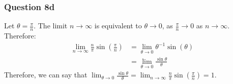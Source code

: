 \documentclass{article}
\begin{document}
\subsubsection*{Question 8d}
Let $\theta=\frac{\pi}{n}$. The limit $n\to\infty$ is equivalent to $\theta\to 0$, as $\frac{\pi}{n}\to 0$ as $n\to \infty$. Therefore:
\begin{align*}
    \lim_{n\to \infty}\frac{n}{\pi}\sin(\frac{\pi}{n}) & = \lim_{\theta\to 0}\theta^{-1}\sin(\theta)   \\
                                                       & = \lim_{\theta\to 0}\frac{\sin\theta}{\theta}
\end{align*}
Therefore, we can say that $\lim_{\theta\to 0}\frac{\sin\theta}{\theta}=\lim_{n\to \infty}\frac{n}{\pi}\sin(\frac{\pi}{n})=1$.
\end{document}
